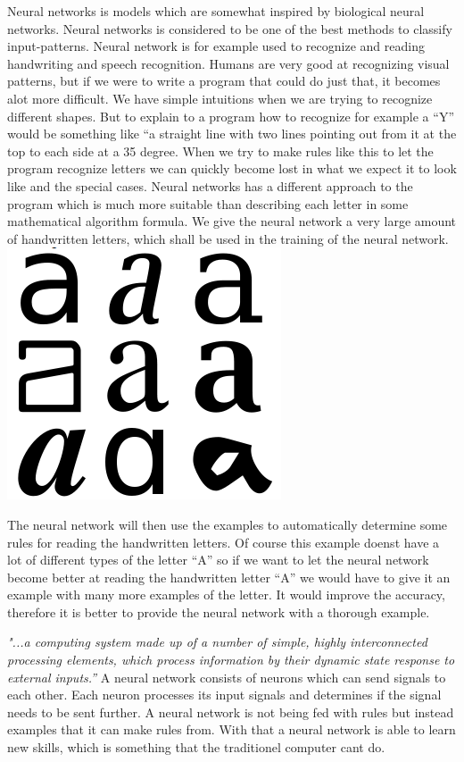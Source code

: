 Neural networks is models which are somewhat inspired by biological neural networks. Neural networks is considered to be one of the best methods to classify input-patterns. Neural network is for example used to recognize and reading handwriting and speech recognition.
Humans are very good at recognizing visual patterns, but if we were to write a program that could do just that, it becomes alot more difficult. We have simple intuitions when we are trying to recognize different shapes. But to explain to a program how to recognize for example a “Y” would be something like “a straight line with two lines pointing out from it at the top to each side at a 35 degree. When we try to make rules like this to let the program recognize letters we can quickly become lost in what we expect it to look like and the special cases.
Neural networks has a different approach to the program which is much more suitable than describing each letter in some mathematical algorithm formula.
We give the neural network a very large amount of handwritten letters, which shall be used in the training of the neural network.
\includegraphics[scale=0.5]{images/nn.png}

The neural network will then use the examples to automatically determine some rules for reading the handwritten letters. Of course this example doenst have a lot of different types of the letter “A” so if we want to let the neural network become better at reading the handwritten letter “A” we would have to give it an example with many more examples of the letter. It would improve the accuracy, therefore it is better to provide the neural network with a thorough example.


\textit{"...a computing system made up of a number of simple, highly interconnected processing elements, which process information by their dynamic state response to external inputs.”}
A neural network consists of neurons which can send signals to each other. Each neuron processes its input signals and determines if the signal needs to be sent further. 
A neural network is not being fed with rules but instead examples that it can make rules from. With that a neural network is able to learn new skills, which is something that the traditionel computer cant do.


